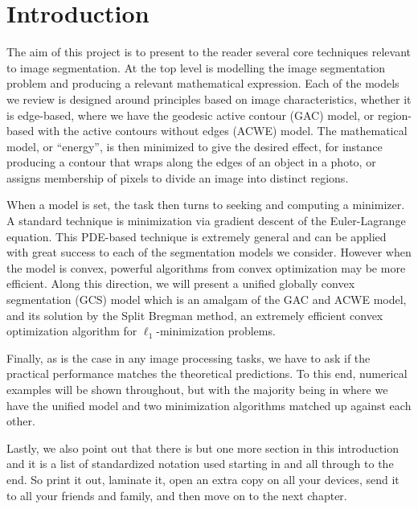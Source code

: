 \chapter{Introduction}
The aim of this project is to present to the reader several core techniques relevant to image segmentation. At the top level is modelling the image segmentation problem and producing a relevant mathematical expression. Each of the models we review is designed around principles based on image characteristics, whether it is edge-based, where we have the geodesic active contour (GAC) model, or region-based with the active contours without edges (ACWE) model. The mathematical model, or ``energy'', is then minimized to give the desired effect, for instance producing a contour that wraps along the edges of an object in a photo, or assigns membership of pixels to divide an image into distinct regions. 

When a model is set, the task then turns to seeking and computing a minimizer. A standard technique is minimization via gradient descent of the Euler-Lagrange equation. This PDE-based technique is extremely general and can be applied with great success to each of the segmentation models we consider. However when the model is convex, powerful algorithms from convex optimization may be more efficient. Along this direction, we will present a unified globally convex segmentation (GCS) model which is an amalgam of the GAC and ACWE model, and its solution by the Split Bregman method, an extremely efficient convex optimization algorithm for $\ell_1$-minimization problems.

Finally, as is the case in any image processing tasks, we have to ask if the practical performance matches the theoretical predictions. To this end, numerical examples will be shown throughout, but with the majority being in  where we have the unified model and two minimization algorithms matched up against each other.


Lastly, we also point out that there is but one more section in this introduction and it is a list of standardized notation used starting in  and all through to the end. So print it out, laminate it, open an extra copy on all your devices, send it to all your friends and family, and then move on to the next chapter. 


